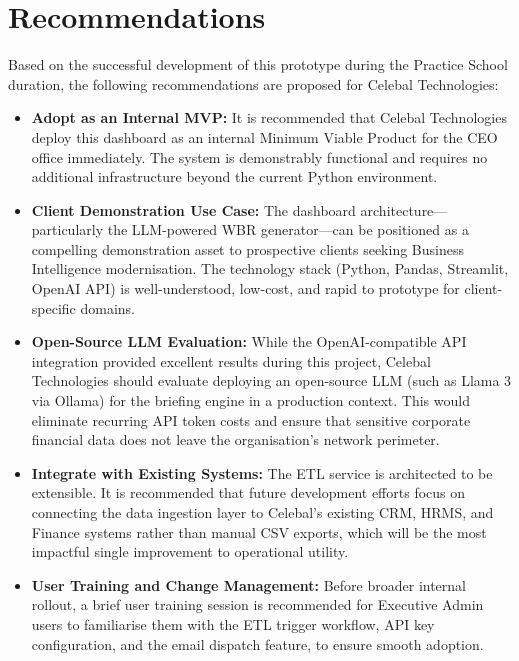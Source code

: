 \documentclass{book}
\begin{document}
\chapter{Recommendations}
Based on the successful development of this prototype during the Practice School duration, the following recommendations are proposed for Celebal Technologies:
\begin{itemize}
    \item \textbf{Adopt as an Internal MVP:} It is recommended that Celebal Technologies deploy this dashboard as an internal Minimum Viable Product for the CEO office immediately. The system is demonstrably functional and requires no additional infrastructure beyond the current Python environment.
    \item \textbf{Client Demonstration Use Case:} The dashboard architecture---particularly the LLM-powered WBR generator---can be positioned as a compelling demonstration asset to prospective clients seeking Business Intelligence modernisation. The technology stack (Python, Pandas, Streamlit, OpenAI API) is well-understood, low-cost, and rapid to prototype for client-specific domains.
    \item \textbf{Open-Source LLM Evaluation:} While the OpenAI-compatible API integration provided excellent results during this project, Celebal Technologies should evaluate deploying an open-source LLM (such as Llama 3 via Ollama) for the briefing engine in a production context. This would eliminate recurring API token costs and ensure that sensitive corporate financial data does not leave the organisation's network perimeter.
    \item \textbf{Integrate with Existing Systems:} The ETL service is architected to be extensible. It is recommended that future development efforts focus on connecting the data ingestion layer to Celebal's existing CRM, HRMS, and Finance systems rather than manual CSV exports, which will be the most impactful single improvement to operational utility.
    \item \textbf{User Training and Change Management:} Before broader internal rollout, a brief user training session is recommended for Executive Admin users to familiarise them with the ETL trigger workflow, API key configuration, and the email dispatch feature, to ensure smooth adoption.
\end{itemize}





\end{document}
